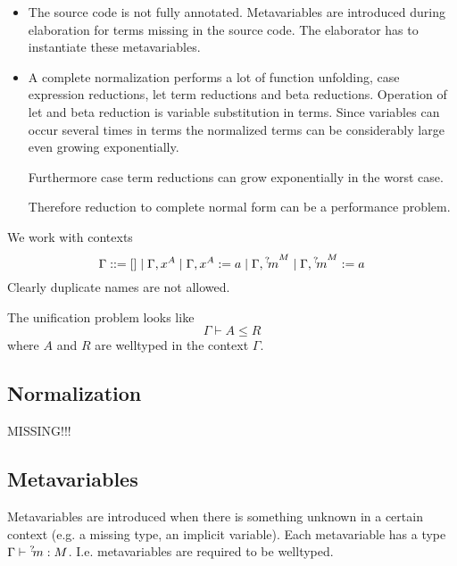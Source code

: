 \begin{itemize}

    \item The source code is not fully annotated. Metavariables are introduced
        during elaboration for terms missing in the source code. The elaborator
        has to instantiate these metavariables.

    \item A complete normalization performs a lot of function unfolding, case
        expression reductions, let term reductions and beta reductions.
        Operation of let and beta reduction is variable substitution in terms.
        Since variables can occur several times in terms the normalized terms
        can be considerably large even growing exponentially.

        Furthermore case term reductions can grow exponentially in the worst
        case.

        Therefore reduction to complete normal form can be a performance
        problem.
\end{itemize}


We work with contexts
$$
    \Gamma ::= [] \mid \Gamma,x^A \mid \Gamma, x^A := a \mid \Gamma, {{}^? \kern-0.2em m}^M
                \mid \Gamma, {{}^? \kern-0.2em m}^M := a
$$
Clearly duplicate names are not allowed.

The unification problem looks like
$$
\Gamma \vdash A \le R
$$
where $A$ and $R$ are welltyped in the context $\Gamma$.





\subsection{Normalization}


MISSING!!!





\subsection{Metavariables}


Metavariables are introduced when there is something unknown in a certain
context (e.g. a missing type, an implicit variable). Each metavariable has a
type $\Gamma \vdash {{}^? \kern-0.2em m} : M$. I.e. metavariables are required to be
welltyped.

